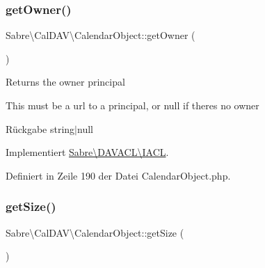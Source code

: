 \mbox{\label{class_sabre_1_1_cal_d_a_v_1_1_calendar_object_a13769288f14402408b0bd4328d48349c}} 
\subsubsection{\texorpdfstring{get\+Owner()}{getOwner()}}
{\footnotesize\ttfamily Sabre\textbackslash{}\+Cal\+D\+A\+V\textbackslash{}\+Calendar\+Object\+::get\+Owner (\begin{DoxyParamCaption}{ }\end{DoxyParamCaption})}

Returns the owner principal

This must be a url to a principal, or null if there\textquotesingle{}s no owner

\begin{DoxyReturn}{Rückgabe}
string$\vert$null 
\end{DoxyReturn}


Implementiert \mbox{\hyperlink{interface_sabre_1_1_d_a_v_a_c_l_1_1_i_a_c_l_a05f531b4ae1a86eab4e6e95b0413390e}{Sabre\textbackslash{}\+D\+A\+V\+A\+C\+L\textbackslash{}\+I\+A\+CL}}.



Definiert in Zeile 190 der Datei Calendar\+Object.\+php.

\mbox{\label{class_sabre_1_1_cal_d_a_v_1_1_calendar_object_a18e48832b3f486a1c5c95da1c2d39661}} 
\subsubsection{\texorpdfstring{get\+Size()}{getSize()}}
{\footnotesize\ttfamily Sabre\textbackslash{}\+Cal\+D\+A\+V\textbackslash{}\+Calendar\+Object\+::get\+Size (\begin{DoxyParamCaption}{ }\end{DoxyParamCaption})}

